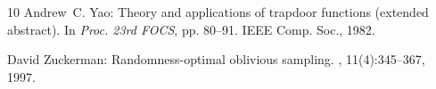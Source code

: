 \begin{thebibliography}{10}
{\sc Andrew~C. Yao}: Theory and applications of trapdoor functions (extended
  abstract).
\newblock In {\em Proc. 23rd FOCS}, pp. 80--91. IEEE Comp. Soc., 1982.

{\sc David Zuckerman}: Randomness-optimal oblivious sampling.
, 11(4):345--367, 1997.

\end{thebibliography}